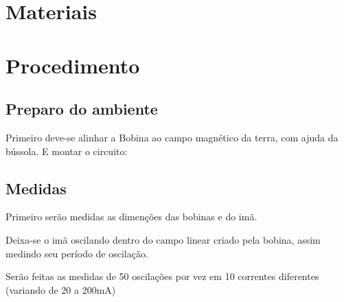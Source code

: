 \documentclass{article}
\begin{document}
    
    \section{Materiais}
        
    \section{Procedimento}
        \subsection{Preparo do ambiente}
            Primeiro deve-se alinhar a Bobina ao campo magnético da terra,
            com ajuda da bússola.
            E montar o circuito:
            
        \subsection{Medidas}
            Primeiro serão medidas as dimenções das bobinas e do imã.
            
            Deixa-se o imã oscilando dentro do campo linear criado
            pela bobina, assim medindo seu período de oscilação.

            Serão feitas as medidas de 50 oscilações por vez em 10
            correntes diferentes (variando de 20 a 200mA)
\end{document}

